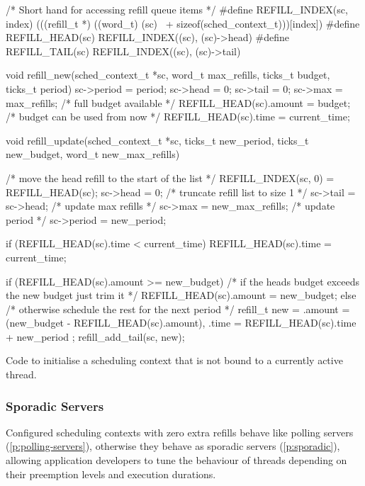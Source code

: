 \begin{listing}[h!]
\begin{ccode}
/* Short hand for accessing refill queue items */
#define REFILL_INDEX(sc, index) (((refill_t *) ((word_t) (sc) \
                                + sizeof(sched_context_t)))[index])
#define REFILL_HEAD(sc) REFILL_INDEX((sc), (sc)->head)
#define REFILL_TAIL(sc) REFILL_INDEX((sc), (sc)->tail)

void refill_new(sched_context_t *sc, word_t max_refills, ticks_t budget, ticks_t period)
{
    sc->period = period;
    sc->head = 0;
    sc->tail = 0;
    sc->max = max_refills;
    /* full budget available */
    REFILL_HEAD(sc).amount = budget;
    /* budget can be used from now */
    REFILL_HEAD(sc).time = current_time;
}

void refill_update(sched_context_t *sc, ticks_t new_period, ticks_t new_budget, 
                   word_t new_max_refills)
{
    /* move the head refill to the start of the list */
    REFILL_INDEX(sc, 0) = REFILL_HEAD(sc);
    sc->head = 0;
    /* truncate refill list to size 1 */
    sc->tail = sc->head;
    /* update max refills */
    sc->max = new_max_refills;
    /* update period */
    sc->period = new_period;

    if (REFILL_HEAD(sc).time < current_time) {
        REFILL_HEAD(sc).time = current_time;
    }

    if (REFILL_HEAD(sc).amount >= new_budget) {
        /* if the heads budget exceeds the new budget just trim it */
        REFILL_HEAD(sc).amount = new_budget;
    } else {
        /* otherwise schedule the rest for the next period */
        refill_t new = { .amount = (new_budget - REFILL_HEAD(sc).amount),
                         .time = REFILL_HEAD(sc).time + new_period
                       };
        refill_add_tail(sc, new);
    }
}
\end{ccode}
\caption{Code to initialise a scheduling context that is not bound to a currently active thread.}
\label{list:refill-init}
\end{listing}

\subsubsection{Sporadic Servers}
\label{sec:impl-sporadic}

Configured scheduling contexts with zero extra refills behave like polling servers (\cref{p:polling-servers}),
otherwise they behave as sporadic servers (\cref{p:sporadic}), allowing application developers to
tune the behaviour of threads depending on their preemption levels and execution durations.

